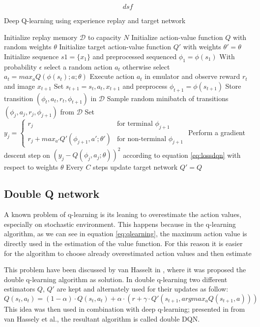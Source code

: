 \documentclass[article,11pt]{article}
\begin{document}
	\begin{equation}
		\label{eq:lossdqn}
		dsf
	\end{equation}
	
	\begin{algorithm}
		\caption{Deep Q-learning using experience replay and target network}
		\label{alg:dqn}
		\small
		\begin{algorithmic}
		\STATE Initialize replay memory $\mathcal{D}$ to capacity $N$
		\STATE Initialize action-value function $Q$ with random weights $\theta$
		\STATE Initialize target action-value function $Q'$ with weights $\theta'=\theta$
		\STATE Initialize sequence $s1 = \{x_1\}$ and preprocessed sequenced $\phi_1 = \phi(s_1)$
		\STATE With probability $\epsilon$ select a random action $a_t$
		\STATE otherwise select $a_t = max_a Q(\phi(s_t); a; \theta)$
		\STATE Execute action $a_t$ in emulator and observe reward $r_t$ and image $x_{t+1}$
		\STATE Set $s_{t+1} = s_t, a_t, x_{t+1}$ and preprocess $\phi_{t+1} = \phi(s_{t+1})$
		\STATE Store transition $(\phi_t, a_t, r_t, \phi_{t+1})$ in $\mathcal{D}$
		\STATE Sample random minibatch of transitions $(\phi_j, a_j, r_j, \phi_{j+1})$ from $\mathcal{D}$
		\STATE Set $y_j =
		\begin{cases}
			r_j & \text{for terminal } \phi_{j+1} \\
			r_j + max_{a'} Q'(\phi_{j+1}, a'; \theta') & \text{for non-terminal } \phi_{j+1}
		\end{cases}$
		\STATE Perform a gradient descent step on $(y_j - Q(\phi_j, a_j ; \theta))^2$ according to equation \ref{eq:lossdqn} with respect to weights $\theta$ 
		\STATE Every $C$ steps update target network $Q'=Q$
		\ENDFOR
		\ENDFOR
		\end{algorithmic}
	\end{algorithm}

	\subsection{Double Q network}
	A known problem of q-learning is its leaning to overestimate the action values, especially on stochastic environment. This happens because in the q-learning algorithm, as we can see in equation \ref{eq:qlearning}, the maximum action value is directly used in the estimation of the value function. For this reason it is easier for the algorithm to choose already overestimated action values and then estimate
	
	This problem have been discussed by van Hasselt in \cite{doubleq}, where it was proposed the double q-learning algorithm as solution. In double q-learning two different estimators $Q$, $Q'$ are kept and alternately used for their updates as follow:
	\begin{equation}
		\label{eq:doubleq}
		Q(s_t, a_t)=(1-\alpha)\cdot Q(s_t, a_t) + \alpha \cdot (r + \gamma\cdot Q'(s_{t+1}, argmax_aQ(s_{t+1}, a)))
	\end{equation}
	This idea was then used in combination with deep q-learning; presented in \cite{doubledqn} from van Hassely et al., the resultant algorithm is called double DQN.
	
\end{document}
